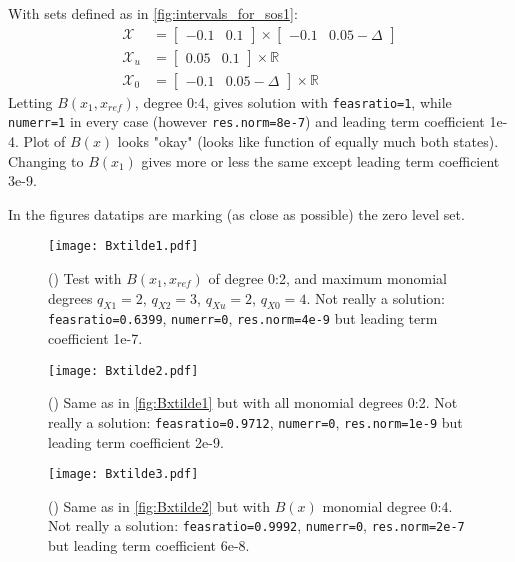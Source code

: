 With sets defined as in \autoref{fig:intervals_for_sos1}:
\begin{subequations}\label{eq:sets_case1}
\begin{align}
\mathcal{X} &= \begin{bmatrix} -0.1 & 0.1\end{bmatrix} \times \begin{bmatrix} -0.1 & 0.05-\Delta\end{bmatrix}\\
\mathcal{X}_u &= \begin{bmatrix} 0.05 & 0.1\end{bmatrix} \times \mathbb{R}\\
\mathcal{X}_0 &= \begin{bmatrix} -0.1 & 0.05-\Delta\end{bmatrix} \times \mathbb{R}
\end{align}
\end{subequations}
Letting $B(x_1,x_{ref})$, degree 0:4, gives solution with \texttt{feasratio=1}, while \texttt{numerr=1} in every case (however \texttt{res.norm=8e-7}) and leading term coefficient 1e-4. Plot of $B(x)$ looks "okay" (looks like function of equally much both states). Changing to $B(x_1)$ gives more or less the same except leading term coefficient 3e-9.

In the figures datatips are marking (as close as possible) the zero level set.

\begin{figure}[htbp]
\centering\texttt{[image: Bxtilde1.pdf]}
\caption{() Test with $B(x_1,x_{ref})$ of degree 0:2, and maximum monomial degrees $q_{X1}=2$, $q_{X2}=3$, $q_{Xu}=2$, $q_{X0}=4$. Not really a solution: \texttt{feasratio=0.6399}, \texttt{numerr=0}, \texttt{res.norm=4e-9} but leading term coefficient 1e-7.}
\label{fig:Bxtilde1}
\end{figure}

\begin{figure}[htbp]
\centering\texttt{[image: Bxtilde2.pdf]}
\caption{() Same as in \autoref{fig:Bxtilde1} but with all monomial degrees 0:2. Not really a solution: \texttt{feasratio=0.9712}, \texttt{numerr=0}, \texttt{res.norm=1e-9} but leading term coefficient 2e-9.}
\label{fig:Bxtilde2}
\end{figure}

\begin{figure}[htbp]
\centering\texttt{[image: Bxtilde3.pdf]}
\caption{() Same as in \autoref{fig:Bxtilde2} but with $B(x)$ monomial degree 0:4. Not really a solution: \texttt{feasratio=0.9992}, \texttt{numerr=0}, \texttt{res.norm=2e-7} but leading term coefficient 6e-8.}
\label{fig:Bxtilde3}
\end{figure}

